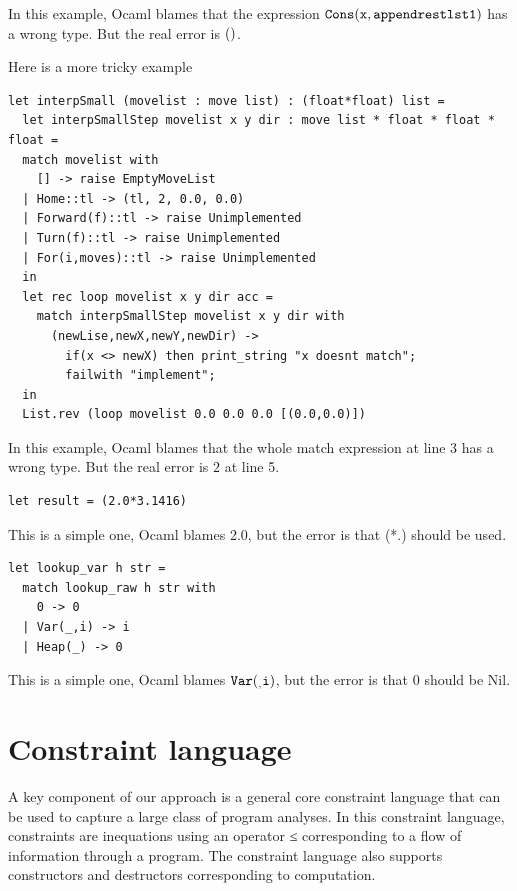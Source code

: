 In this example, Ocaml blames that the expression $\mathtt{Cons(x, append
rest lst1)}$ has a wrong type. But the real error is $\mathtt{()}$.

Here is a more tricky example

\begin{lstlisting}
let interpSmall (movelist : move list) : (float*float) list = 
  let interpSmallStep movelist x y dir : move list * float * float * float = 
  match movelist with
    [] -> raise EmptyMoveList
  | Home::tl -> (tl, 2, 0.0, 0.0)
  | Forward(f)::tl -> raise Unimplemented  
  | Turn(f)::tl -> raise Unimplemented  
  | For(i,moves)::tl -> raise Unimplemented  
  in
  let rec loop movelist x y dir acc =
    match interpSmallStep movelist x y dir with
      (newLise,newX,newY,newDir) -> 
        if(x <> newX) then print_string "x doesnt match";
        failwith "implement";
  in 
  List.rev (loop movelist 0.0 0.0 0.0 [(0.0,0.0)])
\end{lstlisting}

In this example, Ocaml blames that the whole match expression at line
3 has a wrong type. But the real error is $2$ at line 5.

\begin{lstlisting}
let result = (2.0*3.1416)
\end{lstlisting}

This is a simple one, Ocaml blames 2.0, but the error is that (*.)
should be used.

\begin{lstlisting}
let lookup_var h str = 
  match lookup_raw h str with
    0 -> 0
  | Var(_,i) -> i
  | Heap(_) -> 0
\end{lstlisting}

This is a simple one, Ocaml blames $\mathtt{Var(_,i)}$, but the error is that 0
should be Nil.

\section{Constraint language}
\label{sec:language}

A key component of our approach is a general core constraint language
that can be used to capture a large class of program analyses.
In this constraint language, constraints are inequations using an
operator ≤ corresponding
to a flow of information through a program. The constraint language
also supports constructors and destructors corresponding to
computation.

